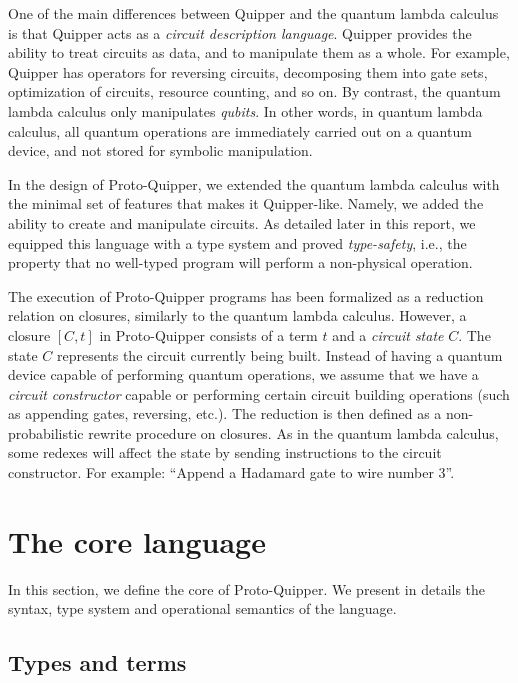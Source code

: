 \documentclass[twoside]{article}
\begin{document}
One of the main differences between Quipper and the quantum lambda
calculus is that Quipper acts as a {\em circuit description language}.
Quipper provides the ability to treat circuits as data, and to
manipulate them as a whole.  For example, Quipper has operators for
reversing circuits, decomposing them into gate sets, optimization of
circuits, resource counting, and so on. By contrast, the quantum
lambda calculus only manipulates {\em qubits}. In other words, in
quantum lambda calculus, all quantum operations are immediately
carried out on a quantum device, and not stored for symbolic
manipulation.

In the design of Proto-Quipper, we extended the quantum lambda
calculus with the minimal set of features that makes it Quipper-like.
Namely, we added the ability to create and manipulate circuits.  As
detailed later in this report, we equipped this language with a type
system and proved {\em type-safety}, i.e., the property that no
well-typed program will perform a non-physical operation.

The execution of Proto-Quipper programs has been formalized as a
reduction relation on closures, similarly to the quantum lambda
calculus.  However, a closure $[C,t]$ in Proto-Quipper consists of a
term $t$ and a \emph{circuit state} $C$. The state $C$ represents the
circuit currently being built. Instead of having a quantum device
capable of performing quantum operations, we assume that we have a
\emph{circuit constructor} capable or performing certain circuit
building operations (such as appending gates, reversing, etc.). The
reduction is then defined as a non-probabilistic rewrite procedure on
closures.  As in the quantum lambda calculus, some redexes will affect
the state by sending instructions to the circuit constructor. For
example: ``Append a Hadamard gate to wire number 3''.


\clearpage
\section{The core language}\label{sec-core}

In this section, we define the core of Proto-Quipper. We 
present in details the syntax, type system and 
operational semantics of the language.

\subsection{Types and terms}
\label{ssec-types-and-terms}
\end{document}
